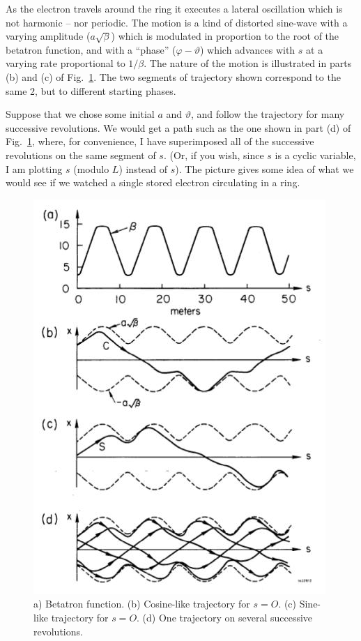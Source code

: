 As the electron travels around the ring it executes a lateral oscillation which is not harmonic -- nor periodic. The motion is a kind of distorted sine-wave with a varying amplitude ($a\sqrt{\beta}$) which is modulated in proportion to the root of the betatron function, and with a “phase” ($\varphi-\vartheta$) which advances with $s$ at a varying rate proportional to $1/\beta$. The nature of the motion is illustrated in parts (b) and (c) of Fig.~\ref{fig:fig12}. The two segments of trajectory shown correspond to the same 2, but to different starting phases.

Suppose that we chose some initial $a$ and $\vartheta$, and follow the trajectory for many successive revolutions. We would get a path such as the one shown in part (d) of Fig.~\ref{fig:fig12}, where, for convenience, I have superimposed all of the successive revolutions on the same segment of $s$. (Or, if you wish, since $s$ is a cyclic variable, I am plotting $s$ (modulo $L$) instead of $s$). The picture gives some idea of what we would see if we watched a single stored electron circulating in a ring.

\begin{figure}[!htb]
	\centering
	\includegraphics[width=0.7\linewidth]{./Figuras/fig12.jpeg}
	\caption{a) Betatron function. (b) Cosine-like trajectory for $s=O$. (c) Sine-like trajectory for $s=O$. (d) One trajectory on several successive revolutions.}
	\label{fig:fig12}
\end{figure}

